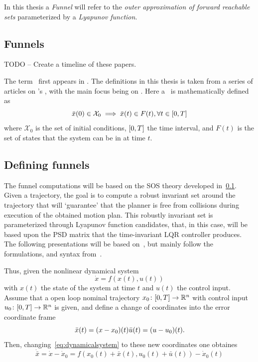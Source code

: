 In this thesis a \textit{Funnel} will refer to the \textit{outer approximation
  of forward reachable sets} parameterized by a \textit{Lyapunov function}.


\subsection{Funnels}
\label{sec:Funnels}

TODO -- Create a timeline of these papers.

The term \funnel\ first appears in \cite{masonMechanicsManipulation1985}. The
\funnel{} definitions in this thesis is taken from a series of articles on
\funnel{}'s \cite{tobenkinInvariantFunnelsTrajectories2010}
\cite{tedrakeLQRtreesFeedbackMotion2009} \cite{majumdarRobustOnlineMotion2013}
\cite{majumdarFunnelLibrariesRealtime2017}
\cite{ahmadiDSOSSDSOSOptimization2017}, with the main focus being on
\cite{majumdarFunnelLibrariesRealtime2017}. Here a \funnel\ is mathematically
defined as
\[
  \bar{x}(0) \in \mathcal{X}_0 \implies \bar{x}(t) \in F(t), \forall t \in
  \lbrack0,T\rbrack
\]
where \(\mathcal{X}_0\) is the set of initial conditions, \(\lbrack0,T\rbrack\) the time
interval, and \(F(t)\) is the set of states that the system can be in at time
\(t\).

\subsection{Defining funnels}

The funnel computations will be based on the \ac{SOS} theory developed
in~\ref{sec:Funnels}. Given a trajectory, the goal is to compute a robust
invariant set around the trajectory that will `guarantee' that the planner is
free from collisions during execution of the obtained motion plan. This robustly
invariant set is parameterized through Lyapunov function candidates, that, in
this case, will be based upon the \ac{PSD} matrix that the time-invariant
\ac{LQR} controller produces. The following presentations will be based
on~\cite{tobenkinInvariantFunnelsTrajectories2010,
  tedrakeLQRtreesFeedbackMotion2009, majumdarRobustOnlineMotion2013}, but mainly
follow the formulations, and syntax
from~\cite{majumdarFunnelLibrariesRealtime2017}.

Thus, given the nonlinear dynamical system
\begin{equation}
  \label{eq:dynamicalsystem}
  \dot{x} = f(x(t), u(t))
\end{equation}
with \(x(t)\) the state of the system at time \(t\) and \(u(t)\) the control
input. Assume that a open loop nominal trajectory \(x_0 \colon [0,T] \rightarrow
\mathbb{R}^n\) with control input \(u_0 \colon [0,T] \rightarrow \mathbb{R}^n\) is given, and
define a change of coordinates into the error coordinate frame
\[
  \bar{x}(t) = (x - x_0)(t) \\
  \bar{u}(t) = (u - u_0)(t).
\]
Then, changing~\ref{eq:dynamicalsystem} to these new coordinates one obtaines
\begin{equation}
  \dot{\bar{x}} = \dot{x} - \dot{x}_0 = f(x_0(t) + \bar{x}(t), u_0(t) + \bar{u}(t)) - \dot{x}_0(t)
\end{equation}

